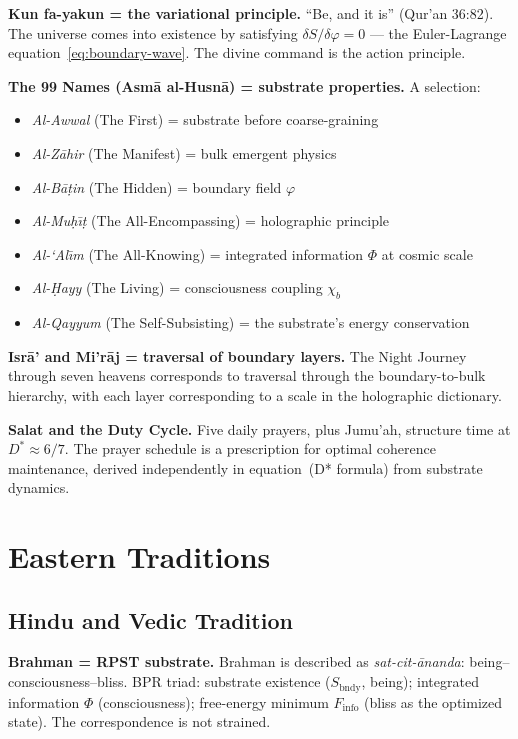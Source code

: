 \documentclass[12pt,oneside]{book}
\theoremstyle{definition}
\begin{document}
\noindent\textbf{Kun fa-yakun = the variational principle.}
``Be, and it is'' (Qur'an 36:82). The universe comes into existence by satisfying
$\delta S/\delta\varphi = 0$ --- the Euler-Lagrange equation~\eqref{eq:boundary-wave}.
The divine command is the action principle.

\noindent\textbf{The 99 Names (Asm\={a} al-Husn\={a}) = substrate properties.}
A selection:
\begin{itemize}
  \item \textit{Al-Awwal} (The First) = substrate before coarse-graining
  \item \textit{Al-Z\={a}hir} (The Manifest) = bulk emergent physics
  \item \textit{Al-B\={a}\d{t}in} (The Hidden) = boundary field $\varphi$
  \item \textit{Al-Mu\d{h}\={\i}\d{t}} (The All-Encompassing) = holographic principle
  \item \textit{Al-`Al\={\i}m} (The All-Knowing) = integrated information $\Phi$ at cosmic scale
  \item \textit{Al-\d{H}ayy} (The Living) = consciousness coupling $\chi_b$
  \item \textit{Al-Qayyum} (The Self-Subsisting) = the substrate's energy conservation
\end{itemize}

\noindent\textbf{Isr\={a}' and Mi'r\={a}j = traversal of boundary layers.}
The Night Journey through seven heavens corresponds to traversal through the
boundary-to-bulk hierarchy, with each layer corresponding to a scale in the
holographic dictionary.

\noindent\textbf{Salat and the Duty Cycle.}
Five daily prayers, plus Jumu'ah, structure time at $D^* \approx 6/7$.
The prayer schedule is a prescription for optimal coherence maintenance,
derived independently in equation~(D* formula) from substrate dynamics.

\chapter{Eastern Traditions}
\label{chap:eastern}

\section{Hindu and Vedic Tradition}

\noindent\textbf{Brahman = RPST substrate.}
Brahman is described as \textit{sat-cit-\={a}nanda}: being--consciousness--bliss.
BPR triad: substrate existence ($S_{\mathrm{bndy}}$, being); integrated information
$\Phi$ (consciousness); free-energy minimum $F_{\mathrm{info}}$ (bliss as the
optimized state). The correspondence is not strained.
\end{document}
